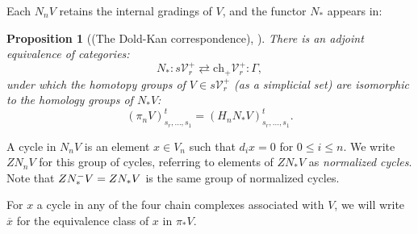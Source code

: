 \documentclass[11pt]{amsart} \renewcommand{\baselinestretch}{1.4}
\theoremstyle{plain}
\newtheorem{prop}[thm]{Proposition}
\theoremstyle{definition}
\newcommand{\calV}{\mathcal{V}}
\newcommand{\citeBOX}[2][]{\cite[\mbox{#1}]{#2}}
\newcommand{\vect}[2]{\calV^{#1}_{#2}}
\newcommand{\Nop}{N^{\smash{-}}}
\newcommand{\complexes}{\mathrm{ch}_+}
\begin{document}
\begin{Conventions and notation}
Each $N_nV$ retains the internal gradings of $V$, and the functor $N_*$ appears in:
\begin{prop}[(The Dold-Kan correspondence), {\citeBOX[\S III.2]{goerss-jardine.pdf}}]
There is an adjoint equivalence of categories:
\[N_*:s\vect{+}{r}\rightleftarrows \complexes \vect{+}{r}:\Gamma,\]
under which the homotopy groups of $V\in s\vect{+}{r}$ (as a simplicial set)  are isomorphic to the homology groups of $N_*V$:
\[(\pi_n V)_{s_r,\ldots,s_1}^t=(H_n N_*V)_{s_r,\ldots,s_1}^t.\]
\end{prop}


%
A cycle in $N_nV$ is an element $x\in V_n$ such that $d_ix=0$ for $0\leq i\leq n$. We write $ZN_nV$ for this group of cycles, referring to elements of $ZN_*V$ as \emph{normalized cycles}. Note that $Z\Nop_*V=ZN_*V$ is the same group of normalized cycles.

For $x$ a cycle in any of the four chain complexes associated with $V$, we will write $\overline{x}$ for the equivalence class of $x$ in $\pi_*V$.


\end{Conventions and notation}
\end{document}
